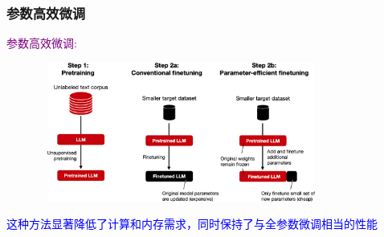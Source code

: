 \begin{frame}
    \frametitle{参数高效微调}
	    \textcolor{purple}{参数高效微调:}\\
		    {\fontsize{7.2pt}{6.2pt}\selectfont{保持预训练模型大部分参数不变的情况下，通过仅调整少量额外参数来适应新任务的技术}}
\begin{figure}[h!]
\vspace*{-0.05in}
\centering
\includegraphics[height=1.8in, width=3.7in, viewport=0 0 1562 778,clip]{Figures/The_idea_of_parameter-efficient_finetuning_techniques.png}
\label{parameter-efficient_finetuning}
\end{figure}
\vskip -0.05in
\textcolor{blue}{这种方法显著降低了计算和内存需求，同时保持了与全参数微调相当的性能}
\end{frame}

